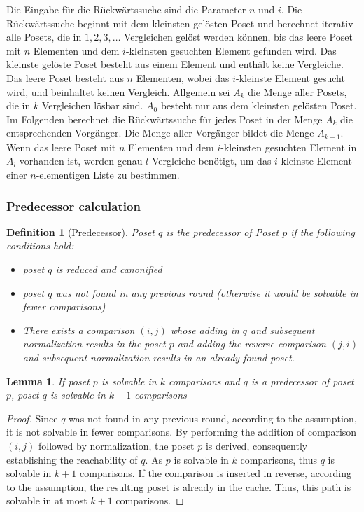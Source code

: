 \documentclass[10pt,journal,compsoc]{IEEEtran}
\newtheorem{lemma}{Lemma}
\newtheorem{definition}{Definition}
\begin{document}
Die Eingabe für die Rückwärtssuche sind die Parameter $n$ und $i$.
Die Rückwärtssuche beginnt mit dem kleinsten gelösten Poset und berechnet iterativ alle Posets, die in $1, 2, 3, \dots$ Vergleichen gelöst werden können, bis das leere Poset mit $n$ Elementen und dem $i$-kleinsten gesuchten Element gefunden wird.
Das kleinste gelöste Poset besteht aus einem Element und enthält keine Vergleiche.
Das leere Poset besteht aus $n$ Elementen, wobei das $i$-kleinste Element gesucht wird, und beinhaltet keinen Vergleich.
Allgemein sei $A_k$ die Menge aller Posets, die in $k$ Vergleichen lösbar sind.
$A_0$ besteht nur aus dem kleinsten gelösten Poset.
Im Folgenden berechnet die Rückwärtssuche für jedes Poset in der Menge $A_k$ die entsprechenden Vorgänger.
Die Menge aller Vorgänger bildet die Menge $A_{k + 1}$.
Wenn das leere Poset mit $n$ Elementen und dem $i$-kleinsten gesuchten Element in $A_l$ vorhanden ist, werden genau $l$ Vergleiche benötigt, um das $i$-kleinste Element einer $n$-elementigen Liste zu bestimmen.

\subsubsection{Predecessor calculation} \label{sec:backward:predecessor_calculation}

\begin{definition}[Predecessor] \label{definition:predecessor_calculation}
  Poset $q$ is the predecessor of Poset $p$ if the following conditions hold:
  \begin{itemize}
    \item poset $q$ is reduced and canonified
    \item poset $q$ was not found in any previous round (otherwise it would be solvable in fewer comparisons)
    \item There exists a comparison $(i, j)$ whose adding in $q$ and subsequent normalization results in the poset $p$ and adding the reverse comparison $(j, i)$ and subsequent normalization results in an already found poset.
  \end{itemize}
\end{definition}

\begin{lemma} \label{lemma:predecessor_calculation}
  If poset $p$ is solvable in $k$ comparisons and $q$ is a predecessor of poset $p$, poset $q$ is solvable in $k + 1$ comparisons
\end{lemma}

\begin{proof} \label{proof:predecessor_calculation}
  Since $q$ was not found in any previous round, according to the assumption, it is not solvable in fewer comparisons.
  By performing the addition of comparison $(i, j)$ followed by normalization, the poset $p$ is derived, consequently establishing the reachability of $q$.
  As $p$ is solvable in $k$ comparisons, thus $q$ is solvable in $k + 1$ comparisons.
  If the comparison is inserted in reverse, according to the assumption, the resulting poset is already in the cache.
  Thus, this path is solvable in at most $k + 1$ comparisons.
\end{proof}
\end{document}

